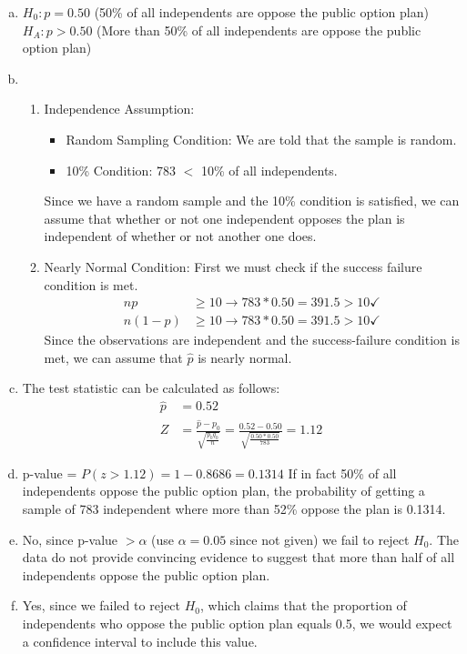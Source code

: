 {
\begin{enumerate}[(a)]

\item $H_0: p = 0.50$ (50\% of all independents are oppose the public option plan) \\
$H_A:  p > 0.50$ (More than 50\% of all independents are oppose the public option plan)

\item 
\begin{enumerate}[1.]
\item Independence Assumption: 
\begin{itemize}
\item Random Sampling Condition: We are told that the sample is random.
\item 10\% Condition: 783 $<$ 10\% of all independents.
\end{itemize}
Since we have a random sample and the 10\% condition is satisfied, we can assume that whether or not one independent opposes the plan is independent of whether or not another one does.
\item Nearly Normal Condition: First we must check if the success failure condition is met.
\begin{align*}
np &\ge 10 \rightarrow  783 * 0.50 = 391.5 > 10 \checkmark \\
n(1 - p) &\ge 10 \rightarrow 783 * 0.50 = 391.5 > 10 \checkmark
\end{align*}
Since the observations are independent and the success-failure condition is met, we can assume that $\hat{p}$ is nearly normal.
\end{enumerate}

\item The test statistic can be calculated as follows:
\begin{align*}
\hat{p} &= 0.52 \\
Z &= \frac{\hat{p} - p_0}{\sqrt{\frac{p_0q_0}{n}}} = \frac{0.52 - 0.50}{\sqrt{\frac{0.50 * 0.50}{783}}} = 1.12
\end{align*}

\item p-value = $P(z > 1.12) = 1 - 0.8686 = 0.1314$
If in fact 50\% of all independents oppose the public option plan, the probability of getting a sample of 783 independent where more than 52\% oppose the plan is 0.1314.

\item No, since p-value $> \alpha$ (use $\alpha = 0.05$ since not given) we fail to reject $H_0$. The data do not provide convincing evidence to suggest that more than half of all independents oppose the public option plan.

\item Yes, since we failed to reject $H_0$, which claims that the proportion of independents who oppose the public option plan equals 0.5, we would expect a confidence interval to include this value.

\end{enumerate}
}\label{WashPost}

